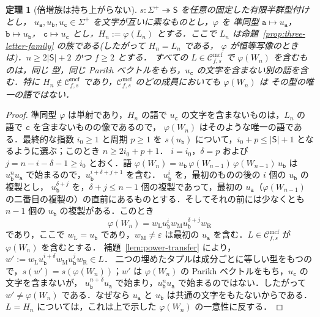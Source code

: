\documentclass[11pt,a4paper]{ltjsarticle}
\numberwithin{equation}{section}
\theoremstyle{plain}
\newtheorem{theorem}{定理}[section]
\theoremstyle{definition}
\theoremstyle{remark}
\newcommand{\Cmcf}[2]{\mathcal{C}^{\mathrm{mcf}}_{#1,#2}}
\newcommand{\eps}{\varepsilon}
\theoremstyle{plain}
\begin{document}
\begin{theorem}[倍増族は持ち上がらない]
\label{thm:doubling-no-lift}
$s:\Sigma^+\twoheadrightarrow\mathsf S$ を任意の固定した有限半群型付けとし，
$u_{\mathtt a},u_{\mathtt b},u_{\mathtt c}\in\Sigma^+$ を文字が互いに素なものとし，$\varphi$ を
準同型 $\mathtt a\mapsto u_{\mathtt a}$，$\mathtt b\mapsto u_{\mathtt b}$，
$\mathtt c\mapsto u_{\mathtt c}$ とし，$H_n:=\varphi(L_n)$ とする．ここで
$L_n$ は命題~\ref{prop:three-letter-family} の族である\textup(したがって $H_n=L_n$ である，
$\varphi$ が恒等写像のときは\textup)．$n\ge2|\mathsf S|+2$ かつ $f\ge2$ とする．
すべての $L\in\Cmcf{f}{s}$ で $\varphi(W_n)$ を含むものは，同じ
型，同じ Parikh ベクトルをもち，$u_{\mathtt c}$ の文字を含まない別の語を含む．特に
$H_n\notin\Cmcf{f}{s}$ であり，$\Cmcf{f}{s}$ のどの成員においても $\varphi(W_n)$ は
その型の唯一の語ではない．
\end{theorem}
\begin{proof}
準同型 $\varphi$ は単射であり，$H_n$ の語で
$u_{\mathtt c}$ の文字を含まないものは，$L_n$ の語で $\mathtt c$ を含まないものの像であるので，
$\varphi(W_n)$ はそのような唯一の語である．最終的な指数 $i_0\ge1$ と周期
$p\ge1$ を $s(u_{\mathtt b})$ について，$i_0+p\le|\mathsf S|+1$ となるように選ぶ；このとき $n\ge2i_0+p+1$．
$i=i_0$，$\delta=p$ および $j=n-i-\delta-1\ge i_0$ とおく．語
$\varphi(W_n)=u_{\mathtt b}\,\varphi(W_{n-1})\,\varphi(W_{n-1})\,u_{\mathtt b}$ は
$u_{\mathtt b}^nu_{\mathtt a}$ で始まるので，$u_{\mathtt b}^{i+\delta+j+1}$ を含む．
$u_{\mathtt b}^i$ を，最初のものの後の $i$ 個の $u_{\mathtt b}$ の複製とし，
$u_{\mathtt b}^{\delta+j}$ を，$\delta+j\le n-1$ 個の複製であって，最初の
$u_{\mathtt a}$（$\varphi(W_{n-1})$ の二番目の複製の）の直前にあるものとする．そしてそれの前には少なくとも
$n-1$ 個の $u_{\mathtt b}$ の複製がある．このとき
\[
 \varphi(W_n)=w_{\mathrm L}u_{\mathtt b}^i w_{\mathrm M}u_{\mathtt b}^{\delta+j}w_{\mathrm R}
\]
であり，ここで $w_{\mathrm L}=u_{\mathtt b}$ であり，$w_{\mathrm M}\ne\eps$ は最初の
$u_{\mathtt a}$ を含む．$L\in\Cmcf{f}{s}$ が $\varphi(W_n)$ を含むとする．
補題~\ref{lem:power-transfer} により，
$w':=w_{\mathrm L}u_{\mathtt b}^{i+\delta}w_{\mathrm M}u_{\mathtt b}^jw_{\mathrm R}\in L$．
二つの埋めたタプルは成分ごとに等しい型をもつので，$s(w')=s(\varphi(W_n))$；$w'$ は
$\varphi(W_n)$ の Parikh ベクトルをもち，$u_{\mathtt c}$ の文字を含まないが，
$u_{\mathtt b}^{n+\delta}u_{\mathtt a}$ で始まり，$u_{\mathtt b}^nu_{\mathtt a}$ で始まるのではない．したがって
$w'\ne\varphi(W_n)$ である．なぜなら $u_{\mathtt a}$ と $u_{\mathtt b}$ は共通の文字をもたないからである．
$L=H_n$ については，これは上で示した $\varphi(W_n)$ の一意性に反する．
\end{proof}
\end{document}
